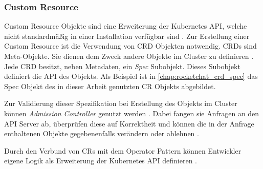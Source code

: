 \subsubsection{Custom Resource}
\label{subsection:kubernetes:customresource}
Custom Resource Objekte sind eine Erweiterung der Kubernetes API,
welche nicht standardmäßig in einer Installation verfügbar sind \cite{kubernetesCustomResource}.
Zur Erstellung einer Custom Resource ist die Verwendung von \acf{CRD} Objekten notwendig. 
\acp{CRD} sind Meta-Objekte.
Sie dienen dem Zweck andere Objekte im Cluster zu definieren \cite{Burns2019}.
Jede \ac{CRD} besitzt, neben Metadaten, ein \emph{Spec} Subobjekt. Dieses Subobjekt definiert die API des Objekts.
Als Beispiel ist in \ref{chap:rocketchat_crd_spec} das Spec Objekt des in dieser Arbeit genutzten \ac{CR} Objekts abgebildet.


Zur Validierung dieser Spezifikation bei Erstellung des Objekts im Cluster können \emph{Admission Controller} genutzt werden \cite{Burns2019}.
Dabei fangen sie Anfragen an den API Server ab, überprüfen diese auf Korrektheit 
und können die in der Anfrage enthaltenen Objekte gegebenenfalls verändern oder ablehnen \cite{Burns2019}. 


Durch den Verbund von \acp{CR} mit dem Operator Pattern können Entwickler eigene Logik als Erweiterung der Kubernetes API definieren \cite{kubernetesCustomResource}.
